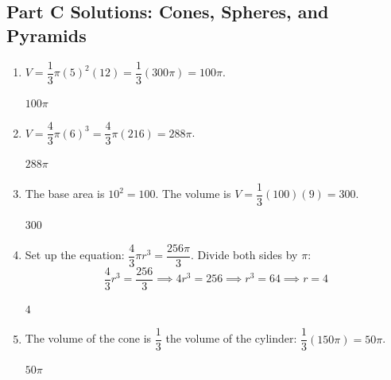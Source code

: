 \documentclass[14pt]{extarticle}
\begin{document}
\subsection*{Part C Solutions: Cones, Spheres, and Pyramids}
\begin{enumerate}
  \item \(V = \dfrac{1}{3}\pi(5)^2(12) = \dfrac{1}{3}(300\pi) = 100\pi\).

  \(\boxed{100\pi}\)

  \item \(V = \dfrac{4}{3}\pi(6)^3 = \dfrac{4}{3}\pi(216) = 288\pi\).

  \(\boxed{288\pi}\)

  \item The base area is \(10^2 = 100\). The volume is \(V = \dfrac{1}{3}(100)(9) = 300\).

  \(\boxed{300}\)

  \item Set up the equation: \(\dfrac{4}{3}\pi r^3 = \dfrac{256\pi}{3}\). Divide both sides by \(\pi\):
  \[
  \frac{4}{3}r^3 = \frac{256}{3} \implies 4r^3 = 256 \implies r^3 = 64 \implies r = 4
  \]

  \(\boxed{4}\)

  \item The volume of the cone is \(\dfrac{1}{3}\) the volume of the cylinder: \(\dfrac{1}{3}(150\pi) = 50\pi\).

  \(\boxed{50\pi}\)
\end{enumerate}
\end{document}
